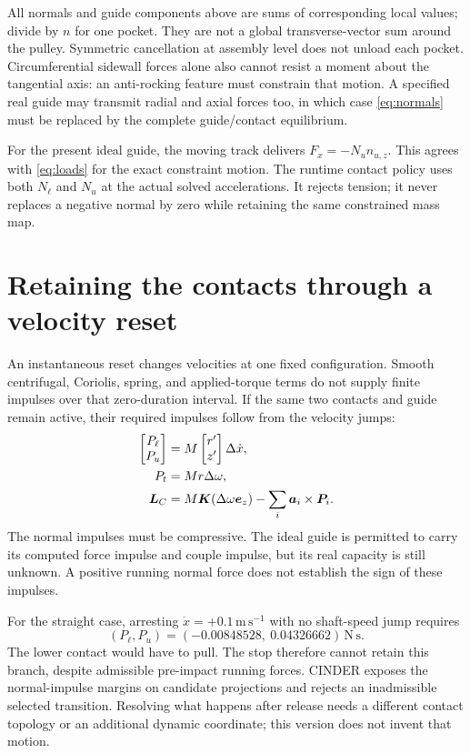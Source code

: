 \documentclass[11pt,letterpaper]{article}
\numberwithin{equation}{section}
\begin{document}
All normals and guide components above are sums of corresponding local values;
divide by $n$ for one pocket. They are not a global transverse-vector sum around
the pulley. Symmetric cancellation at assembly level does not unload each
pocket. Circumferential sidewall forces alone also cannot resist a moment
about the tangential axis: an anti-rocking feature must constrain that motion.
A specified real guide may transmit radial and axial forces too, in which case
\cref{eq:normals} must be replaced by the complete guide/contact equilibrium.

For the present ideal guide, the moving track delivers
$F_x=-N_u n_{u,z}$. This agrees with \cref{eq:loads} for the exact constraint
motion. The runtime contact policy uses both $N_\ell$ and $N_u$ at the actual
solved accelerations. It rejects tension; it never replaces a negative normal
by zero while retaining the same constrained mass map.

\section{Retaining the contacts through a velocity reset}
\label{sec:impact}

An instantaneous reset changes velocities at one fixed configuration. Smooth
centrifugal, Coriolis, spring, and applied-torque terms do not supply finite
impulses over that zero-duration interval. If the same two contacts and guide
remain active, their required impulses follow from the velocity jumps:
\begin{align}
 [\bm n_\ell\ \bm n_u]
 \begin{bmatrix}P_\ell\\P_u\end{bmatrix}
   &=M\begin{bmatrix}r'\\z'\end{bmatrix}\Delta\dot x,\\
 P_t&=Mr\Delta\omega,\\
 \bm L_C&=M\bm K(\Delta\omega\ez)
             -\sum_i\bm a_i\times\bm P_i.
 \label{eq:impulse}
\end{align}
The normal impulses must be compressive. The ideal guide is permitted to carry
its computed force impulse and couple impulse, but its real capacity is still
unknown. A positive running normal force does not establish the sign of these
impulses.

For the straight case, arresting $\dot x=+0.1\,\mathrm{m\,s^{-1}}$ with no
shaft-speed jump requires
\begin{equation}
 (P_\ell,P_u)=(-0.00848528,\ 0.04326662)\,\mathrm{N\,s}.
\end{equation}
The lower contact would have to pull. The stop therefore cannot retain this
branch, despite admissible pre-impact running forces. CINDER exposes the
normal-impulse margins on candidate projections and rejects an inadmissible
selected transition. Resolving what happens after release needs a different
contact topology or an additional dynamic coordinate; this version does not
invent that motion.
\end{document}
